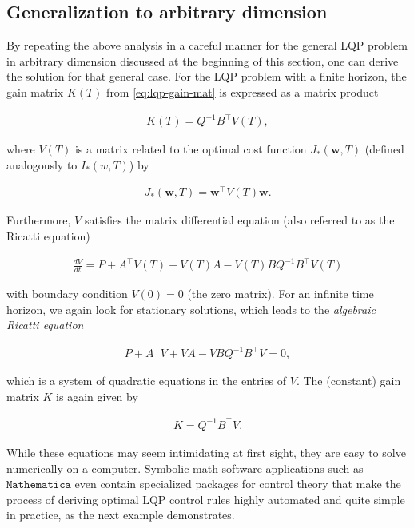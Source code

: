 \documentclass[11pt]{report}
\theoremstyle{plain}
\theoremstyle{definition}
\begin{document}
\subsection{Generalization to arbitrary dimension}

By repeating the above analysis in a careful manner
for the general LQP problem in arbitrary dimension
discussed at the beginning of this section, one can
derive the solution for that general case. For the LQP
problem with a finite horizon, the gain matrix $K(T)$
from \eqref{eq:lqp-gain-mat} is expressed as a matrix
product

\begin{align*}
K(T) = Q^{-1}B^\top V(T),
\end{align*}

\noindent where $V(T)$ is a matrix related to the optimal cost
function $J_*(\mathbf{w},T)$ (defined analogously to
$I_*(w,T)$) by

\begin{align*}
J_*(\mathbf{w},T) = \mathbf{w}^\top V(T)\mathbf{w}.
\end{align*}

\noindent Furthermore, $V$ satisfies the matrix differential
equation (also referred to as the Ricatti equation)

\begin{align*}
\frac{dV}{dt} = P + A^\top V(T) + V(T) A - V(T) B Q^{-1} B^\top V(T)
\end{align*}

\noindent with boundary condition $V(0) = 0$ (the zero matrix).
For an infinite time horizon, we again look for
stationary solutions, which leads to the \emph{algebraic
Ricatti equation}

\begin{align*}
P + A^\top V + V A - V B Q^{-1} B^\top V = 0,
\end{align*}

\noindent which is a system of quadratic equations in the
entries of $V$. The (constant) gain matrix $K$ is
again given by

\begin{align*}
K = Q^{-1}B^\top V.
\end{align*}

\noindent While these equations may seem intimidating at first
sight, they are easy to solve numerically on a
computer. Symbolic math software applications such as
$\texttt{Mathematica}$ even contain specialized
packages for control theory that make the process of
deriving optimal LQP control rules highly automated
and quite simple in practice, as the next example
demonstrates.
\end{document}
